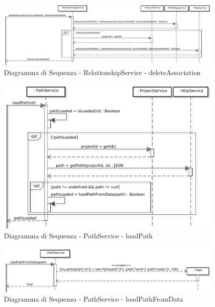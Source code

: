 \FloatBarrier
{}
\begin{center}
\begin{figure}[h]
\centering
\includegraphics[scale=0.27,keepaspectratio]{diagrammi/sequenza/FrontEnd/services/deleteAssociation.pdf}
\caption{Diagramma di Sequenza - RelationshipService - deleteAssociation}
\end{figure}
\end{center}
\FloatBarrier
{}
\begin{center}
\begin{figure}[h]
\centering
\includegraphics[scale=0.33,keepaspectratio]{diagrammi/sequenza/FrontEnd/services/loadPath.pdf}
\caption{Diagramma di Sequenza - PathService - loadPath}
\end{figure}
\end{center}
\FloatBarrier
{}
\begin{center}
\begin{figure}[h]
\centering
\includegraphics[scale=0.33,keepaspectratio]{diagrammi/sequenza/FrontEnd/services/loadPathFromData.pdf}
\caption{Diagramma di Sequenza - PathService - loadPathFromData}
\end{figure}
\end{center}

